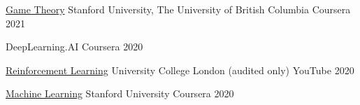 \begin{cvhonors}
  \cvhonor
    {\href{https://www.coursera.org/account/accomplishments/certificate/ZVWNNHWAJUWC}{Game Theory}} %
    {Stanford University, The University of British Columbia} %
    {Coursera} %
    {2021} %


  \cvhonor
    {\dlspec} %
    {DeepLearning.AI} %
    {Coursera} %
    {2020} %

%
%
%
%


  \cvhonor
    {\href{https://www.youtube.com/watch?v=2pWv7GOvuf0&list=PLqYmG7hTraZBiG_XpjnPrSNw-1XQaM_gB}{Reinforcement Learning}} %
    {University College London (audited only)} %
    {YouTube} %
    {2020} %

  \cvhonor
    {\href{https://www.coursera.org/account/accomplishments/certificate/2XNJSGPREAQY}{Machine Learning}} %
    {Stanford University} %
    {Coursera} %
    {2020} %

\end{cvhonors}
